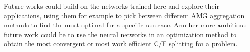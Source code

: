 \documentclass[review]{siamart190516}
\begin{document}
Future works could build on the networks trained here and explore their applications, using them for example to pick between different AMG aggregation methods to find the most optimal for a specific use case.  Another more ambitious future work could be to use the neural networks in an optimization method to obtain the most convergent or most work efficient C/F splitting for a problem.



\end{document}
